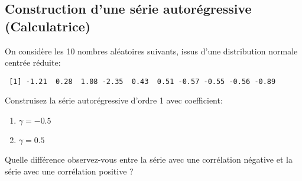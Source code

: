 \documentclass[11pt,english,francais]{article}
\begin{document}
\subsection{Construction d'une série autorégressive (Calculatrice)}
\label{sec:constr-dune-serie}

On considère les 10 nombres aléatoires suivants, issus d'une distribution normale centrée réduite:

\begin{verbatim}
 [1] -1.21  0.28  1.08 -2.35  0.43  0.51 -0.57 -0.55 -0.56 -0.89
\end{verbatim}

Construisez la série autorégressive d'ordre 1 avec coefficient: 
\begin{enumerate}
\item $\gamma = -0.5$
\item $\gamma = 0.5$
\end{enumerate}

Quelle différence observez-vous entre la série avec une corrélation négative et la série avec une corrélation positive ?

\clearpage


\end{document}
